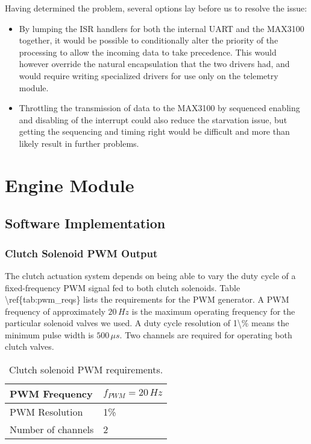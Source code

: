 Having determined the problem, several options lay before us to resolve the issue:
\begin{itemize}
  \item By lumping the ISR handlers for both the internal UART and the MAX3100 together, it would be possible to conditionally alter the priority of the processing to allow the incoming data to take precedence. This would however override the natural encapsulation that the two drivers had, and would require writing specialized drivers for use only on the telemetry module.
  \item Throttling the transmission of data to the MAX3100 by sequenced enabling and disabling of the interrupt could also reduce the starvation issue, but getting the sequencing and timing right would be difficult and more than likely result in further problems.
\end{itemize}

\chapter{Engine Module}

\label{chap:engine}


\section{Software Implementation}


\subsection{Clutch Solenoid PWM Output}

The clutch actuation system depends on being able to vary the duty
cycle of a fixed-frequency PWM signal fed to both clutch solenoids.
Table \textbackslash{}ref\{tab:pwm\_reqs\} lists the requirements
for the PWM generator. A PWM frequency of approximately $20\, Hz$
is the maximum operating frequency for the particular solenoid valves
we used. A duty cycle resolution of 1\textbackslash{}\% means the
minimum pulse width is $500\,\mu s$. Two channels are required for
operating both clutch valves.

%
\begin{table}
\caption{Clutch solenoid PWM requirements.\label{tab:pwm_reqs}}


\centering{}\begin{tabular}{|l|l|}
\hline 
PWM Frequency  & $f_{PWM}=20\, Hz$\tabularnewline
\hline 
PWM Resolution  & 1\% \tabularnewline
\hline 
Number of channels  & 2 \tabularnewline
\hline
\end{tabular}
\end{table}


